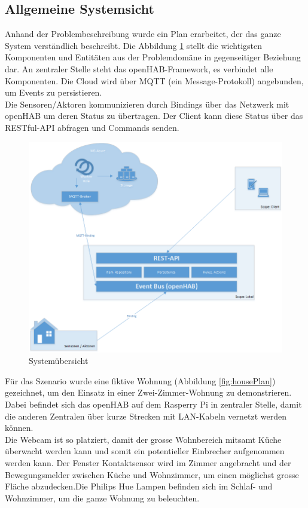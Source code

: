 \subsection{Allgemeine Systemsicht}
Anhand der Problembeschreibung wurde ein Plan erarbeitet, der das ganze System verständlich beschreibt. Die Abbildung \ref{fig:systemView} stellt die wichtigsten Komponenten und Entitäten aus der Problemdomäne in gegenseitiger Beziehung dar. An zentraler Stelle steht das openHAB-Framework, es verbindet alle Komponenten. Die Cloud wird über MQTT (ein Message-Protokoll) angebunden, um Events zu persistieren.\\
Die Sensoren/Aktoren kommunizieren durch Bindings über das Netzwerk mit openHAB um deren Status zu übertragen. Der Client kann diese Status über das RESTful-API abfragen und Commands senden.

\begin{figure}[H]
	\centering
		\includegraphics[scale=0.55]{report/img/systemuebersicht}
	\caption{Systemübersicht}
	\label{fig:systemView}
\end{figure}

Für das Szenario wurde eine fiktive Wohnung (Abbildung \ref{fig:housePlan}) gezeichnet, um den Einsatz in einer Zwei-Zimmer-Wohnung zu demonstrieren. Dabei befindet sich das openHAB auf dem Rasperry Pi in zentraler Stelle, damit die anderen Zentralen über kurze Strecken mit LAN-Kabeln vernetzt werden können.\\
Die Webcam ist so platziert, damit der grosse Wohnbereich mitsamt Küche überwacht werden kann und somit ein potentieller Einbrecher aufgenommen werden kann. Der Fenster Kontaktsensor wird im Zimmer angebracht und der Bewegungsmelder zwischen Küche und Wohnzimmer, um einen möglichst grosse Fläche abzudecken.Die Philips Hue Lampen befinden sich im Schlaf- und Wohnzimmer, um die ganze Wohnung zu beleuchten.

